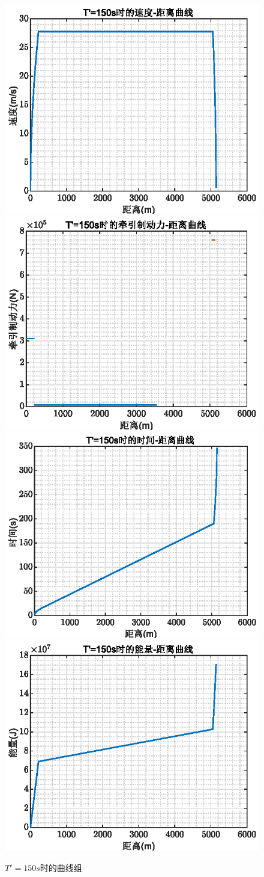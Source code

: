 \documentclass[12pt,a4paper]{nmmcm}
\begin{document}
\begin{figure}[H]
\centering
\includegraphics[width=.49\textwidth,height=0.3\textwidth]{figures/150a.eps}
\includegraphics[width=.49\textwidth,height=0.3\textwidth]{figures/150b.eps}
\includegraphics[width=.49\textwidth,height=0.3\textwidth]{figures/150c.eps}
\includegraphics[width=.49\textwidth,height=0.3\textwidth]{figures/150d.eps}
\caption{\song\wuhao $T'=150s$时的曲线组}
\end{figure}
\end{document}
